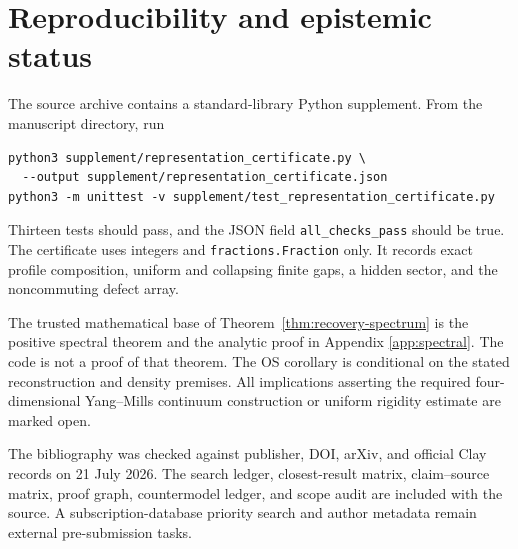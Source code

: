 \section{Reproducibility and epistemic status}
\label{app:reproducibility}

The source archive contains a standard-library Python supplement.  From the
manuscript directory, run
\begin{verbatim}
python3 supplement/representation_certificate.py \
  --output supplement/representation_certificate.json
python3 -m unittest -v supplement/test_representation_certificate.py
\end{verbatim}
Thirteen tests should pass, and the JSON field \verb|all_checks_pass| should
be true.  The certificate uses integers and \verb|fractions.Fraction| only.
It records exact profile composition, uniform and collapsing finite gaps, a
hidden sector, and the noncommuting defect array.

The trusted mathematical base of Theorem~\ref{thm:recovery-spectrum} is the
positive spectral theorem and the analytic proof in Appendix
\ref{app:spectral}.  The code is not a proof of that theorem.  The OS
corollary is conditional on the stated reconstruction and density premises.
All implications asserting the required four-dimensional Yang--Mills
continuum construction or uniform rigidity estimate are marked open.

The bibliography was checked against publisher, DOI, arXiv, and official
Clay records on 21 July 2026.  The search ledger, closest-result matrix,
claim--source matrix, proof graph, countermodel ledger, and scope audit are
included with the source.  A subscription-database priority search and author
metadata remain external pre-submission tasks.
